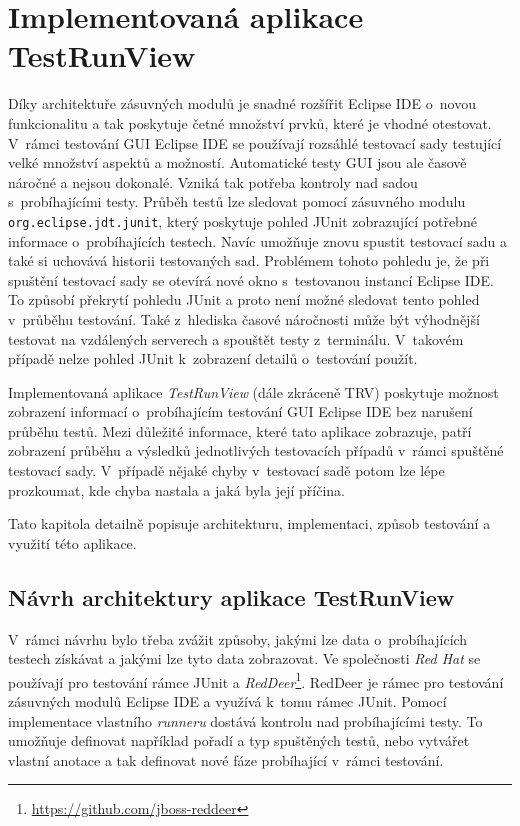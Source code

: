 \chapter{Implementovaná aplikace TestRunView}
\label{chapter:TRV}
Díky architektuře zásuvných modulů je snadné rozšířit Eclipse IDE o~novou funkcionalitu a tak poskytuje četné množství prvků, které je vhodné otestovat. V~rámci testování GUI Eclipse IDE se používají rozsáhlé testovací sady testující velké množství aspektů a možností. Automatické testy GUI jsou ale časově náročné a nejsou dokonalé. Vzniká tak potřeba kontroly nad sadou s~probíhajícími testy. Průběh testů lze sledovat pomocí zásuvného modulu \texttt{org.eclipse.jdt.junit}, který poskytuje pohled JUnit zobrazující potřebné informace o~probíhajících testech. Navíc umožňuje znovu spustit testovací sadu a také si uchovává historii testovaných sad. Problémem tohoto pohledu je, že při spuštění testovací sady se otevírá nové okno s~testovanou instancí Eclipse IDE. To způsobí překrytí pohledu JUnit a proto není možné sledovat tento pohled v~průběhu testování. Také z~hlediska časové náročnosti může být výhodnější testovat na vzdálených serverech a spouštět testy z~terminálu. V~takovém případě nelze pohled JUnit k~zobrazení detailů o~testování použít.

Implementovaná aplikace \emph{TestRunView} (dále zkráceně TRV) poskytuje možnost zobrazení informací o~probíhajícím testování GUI Eclipse IDE bez narušení průběhu testů. Mezi důležité informace, které tato aplikace zobrazuje, patří zobrazení průběhu a výsledků jednotlivých testovacích případů v~rámci spuštěné testovací sady. V~případě nějaké chyby v~testovací sadě potom lze lépe prozkoumat, kde chyba nastala a jaká byla její příčina.

Tato kapitola detailně popisuje architekturu, implementaci, způsob testování a využití této aplikace.

  \section{Návrh architektury aplikace TestRunView}

  V~rámci návrhu bylo třeba zvážit způsoby, jakými lze data o~probíhajících testech získávat a jakými lze tyto data zobrazovat. Ve společnosti \emph{Red Hat} se používají pro testování rámce JUnit a \emph{RedDeer}\footnote{\url{https://github.com/jboss-reddeer}}. RedDeer je rámec pro testování zásuvných modulů Eclipse IDE a využívá k~tomu rámec JUnit. Pomocí implementace vlastního \emph{runneru} dostává kontrolu nad probíhajícími testy. To umožňuje definovat například pořadí a typ spuštěných testů, nebo vytvářet vlastní anotace a tak definovat nové fáze probíhající v~rámci testování.

